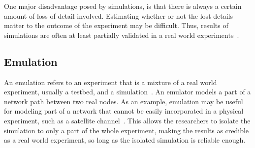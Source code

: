 One major disadvantage posed by simulations, is that there is always a certain amount of loss of detail involved. Estimating whether or not the lost details matter to the outcome of the experiment may be difficult. Thus, results of simulations are often at least partially validated in a real world experiments~\cite{Allman99}.    

\subsection{Emulation}

An emulation refers to an experiment that is a mixture of a real world experiment, usually a testbed, and a simulation~\cite{Allman99}. An emulator models a part of a network path between two real nodes. As an example, emulation may be useful for modeling part of a network that cannot be easily incorporated in a physical experiment, such as a satellite channel~\cite{Allman99}. This allows the researchers to isolate the simulation to only a part of the whole experiment, making the results as credible as a real world experiment, so long as the isolated simulation is reliable enough.   